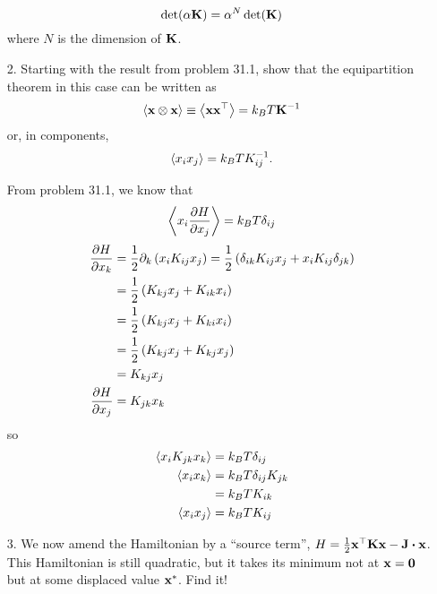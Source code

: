 \documentclass[a4paper,twoside]{article}
\begin{document}
\begin{itemize}
\begin{problem}
\begin{equation}
                \det(\alpha \vb{K}) = \alpha^N \det(\vb{K})
            \end{equation}
            where $ N $ is the dimension of $ \vb{K} $.
        \end{problem}
    \item[2.] Starting with the result from problem 31.1, show that the equipartition theorem in this case can be written as
        \begin{equation}
            \ev{\vb{x} \otimes \vb{x}} \equiv \ev{\vb{x} \vb{x}^\top} = k_B T \vb{K}^{-1}
        \end{equation}
        or, in components,
        \begin{equation}
            \ev{x_i x_j} = k_B T K_{ij}^{-1}.
        \end{equation}
        \begin{problem}
            From problem 31.1, we know that
            \begin{equation}
                \ev{x_i \pdv{H}{x_j}} = k_B T \delta_{ij}
            \end{equation}
            \begin{align}
                \pdv{H}{x_k} &= \frac{1}{2} \partial_k \left( x_i K_{ij} x_j \right) = \frac{1}{2} \left( \delta_{ik} K_{ij} x_j + x_i K_{ij} \delta_{jk} \right) \\
                &= \frac{1}{2} \left( K_{kj} x_j + K_{ik} x_i \right) \\
                &= \frac{1}{2} \left( K_{kj} x_j + K_{ki} x_i \right) \\
                &= \frac{1}{2} \left( K_{kj} x_j + K_{kj} x_j \right) \\
                &= K_{kj} x_j \\
                \pdv{H}{x_j} &= K_{jk} x_k
            \end{align}
            so
            \begin{align}
                \ev{x_i K_{jk} x_k} &= k_B T \delta_{ij} \\
                \ev{x_i x_k} &= k_B T \delta_{ij} K_{jk} \\
                &= k_B T K_{ik} \\
                \ev{x_i x_j} &= k_B T K_{ij}
            \end{align}
        \end{problem}
    \item[3.] We now amend the Hamiltonian by a ``source term'', $ H = \frac{1}{2} \vb{x}^\top \vb{K} \vb{x} - \vb{J} \vdot \vb{x} $. This Hamiltonian is still quadratic, but it takes its minimum not at $ \vb{x} = \vb{0} $ but at some displaced value $ \vb{x}^* $. Find it!

\end{itemize}
\end{document}
